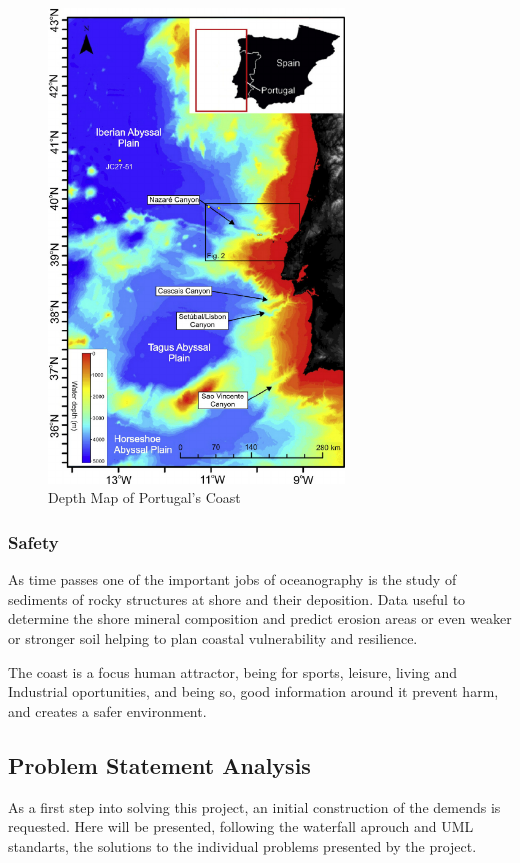 \begin{figure}[H]
    \centering
    \includegraphics[angle=90,origin=c,width=0.7\textwidth]{images/maps/pt_depth.png}  %
    \vspace{-2.2cm}
    \caption{Depth Map of Portugal's Coast}
    \label{fig:Depth Map of Portugal's Coast}        
\end{figure}


\subsubsection{Safety}
As time passes one of the important jobs of oceanography is the study of sediments of rocky
structures at shore and their deposition. Data useful to determine the shore mineral composition
and predict erosion areas or even weaker or stronger soil helping to plan coastal vulnerability and resilience.

The coast is a focus human attractor, being for sports, leisure, living and Industrial oportunities, and being so, good information around it
prevent harm, and creates a safer environment.   

\subsection{Problem Statement Analysis}
As a first step into solving this project, an initial construction of the
demends is requested. Here will be presented, following the waterfall aprouch
and UML standarts, the solutions to the individual problems presented by the project.

